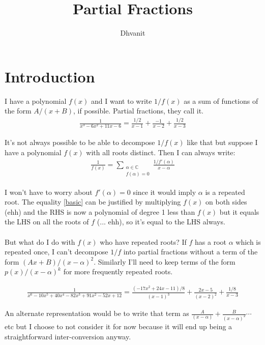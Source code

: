 \documentclass{article}
\title{Partial Fractions}
\author{Dhvanit}
\begin{document}
\maketitle

\section*{Introduction}
I have a polynomial $f(x)$ and I want to write $1/f(x)$ as a sum of functions of the form $A/(x+B)$, if possible. Partial fractions, they call it.
\begin{align}
    \frac{1}{x^3 - 6x^2 + 11x - 6} = \frac{1/2}{x-1} + \frac{-1}{x-2} + \frac{1/2}{x-3}
\end{align}

It's not always possible to be able to decompose $1/f(x)$ like that but suppose I have a polynomial $f(x)$ with all roots distinct. Then I can always write:
\begin{align}
    \frac{1}{f(x)} = \sum_{\substack{\alpha \in \mathbb{C} \\ f(\alpha) = 0}} \frac{1/f'(\alpha)}{x-\alpha} \label{basic}
\end{align}

I won't have to worry about $f'(\alpha) = 0$ since it would imply $\alpha$ is a repeated root. The equality \eqref{basic} can be justified by multiplying $f(x)$ on both sides (ehh) and the RHS is now a polynomial of degree 1 less than $f(x)$ but it equals the LHS on all the roots of $f$ (... ehh), so it's equal to the LHS always.
\\\\
But what do I do with $f(x)$ who have repeated roots? If $f$ has a root $\alpha$ which is repeated once, I can't decompose $1/f$ into partial fractions without a term of the form $(Ax+B)/(x-\alpha)^2$. Similarly I'll need to keep terms of the form $p(x)/(x-\alpha)^k$ for more frequently repeated roots.

\begin{align}
    \frac{1}{x^6 - 10 x^5 + 40 x^4 - 82 x^3 + 91 x^2 - 52 x + 12} = \frac{(-17x^2+24x-11)/8}{(x-1)^3} + \frac{2x-5}{(x-2)^2} + \frac{1/8}{x-3}
\end{align}

\begin{tcolorbox}An alternate representation would be to write that term as $\frac{A}{(x-\alpha)} + \frac{B}{(x-\alpha)^2} \cdots$ etc but I choose to not consider it for now because it will end up being a straightforward inter-conversion anyway.
\end{tcolorbox}
\end{document}

